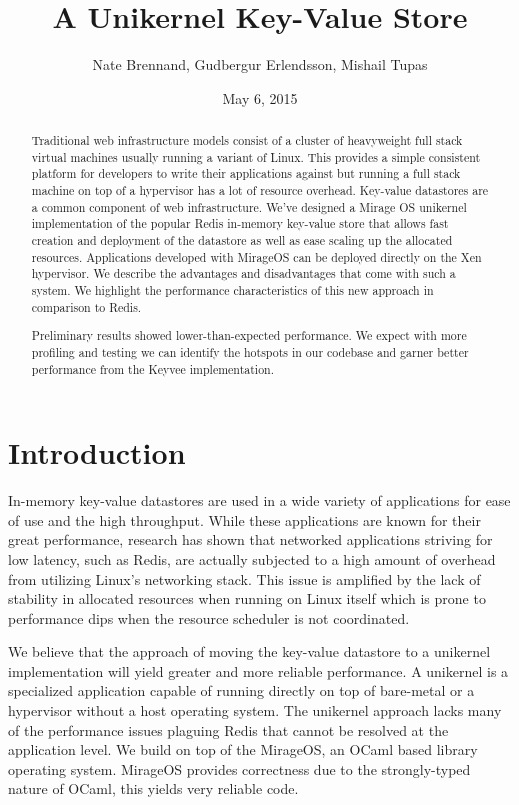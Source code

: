 \documentclass[english,10pt,twocolumn]{article}
\begin{document}
\title{A Unikernel Key-Value Store}
\author{Nate Brennand, Gudbergur Erlendsson, Mishail Tupas}
\date{May 6, 2015}
\maketitle
\thispagestyle{empty}


\begin{abstract}
Traditional web infrastructure models consist of a cluster of heavyweight full stack virtual machines usually running a variant of Linux.
This provides a simple consistent platform for developers to write their applications against but running a full stack machine on top of a hypervisor has a lot of resource overhead.
Key-value datastores are a common component of web infrastructure.
We've designed a Mirage OS\cite{mirage} unikernel implementation of the popular Redis\cite{redis} in-memory key-value store that allows fast creation and deployment of the datastore as well as ease scaling up the allocated resources.
Applications developed with MirageOS can be deployed directly on the Xen hypervisor.
We describe the advantages and disadvantages that come with such a system.
We highlight the performance characteristics of this new approach in comparison to Redis.

Preliminary results showed lower-than-expected performance.
We expect with more profiling and testing we can identify the hotspots in our codebase and garner better performance from the Keyvee implementation.
\end{abstract}


\section{Introduction}
In-memory key-value datastores are used in a wide variety of applications for ease of use and the high throughput.
While these applications are known for their great performance, research has shown that networked applications striving for low latency, such as Redis, are actually subjected to a high amount of overhead from utilizing Linux's networking stack.\cite{arrakis}
This issue is amplified by the lack of stability in allocated resources when running on Linux itself which is prone to performance dips when the resource scheduler is not coordinated.

We believe that the approach of moving the key-value datastore to a unikernel implementation will yield greater and more reliable performance.
A unikernel is a specialized application capable of running directly on top of bare-metal or a hypervisor without a host operating system.
The unikernel approach lacks many of the performance issues plaguing Redis that cannot be resolved at the application level.
We build on top of the MirageOS\cite{mirage}, an OCaml based library operating system.
MirageOS provides correctness due to the strongly-typed nature of OCaml, this yields very reliable code.
\end{document}
